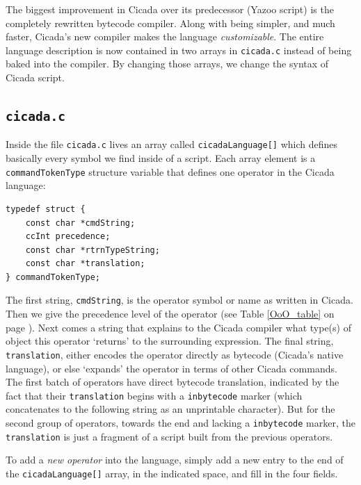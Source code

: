 \documentclass{article}
\newenvironment{code}{
       \begin{list}{}{
               \setlength{\leftmargin}{.4in}
               \setlength{\rightmargin}{0in}
               \setlength{\topsep}{.2in}
       }
       \small
       \item[] }
       { \end{list}   }
\begin{document}
The biggest improvement in Cicada over its predecessor (Yazoo script) is the completely rewritten bytecode compiler.  Along with being simpler, and much faster, Cicada's new compiler makes the language \emph{customizable}.  The entire language description is now contained in two arrays in \verb#cicada.c# instead of being baked into the compiler.  By changing those arrays, we change the syntax of Cicada script.



\subsection{\texttt{cicada.c}}

Inside the file \verb#cicada.c# lives an array called \verb#cicadaLanguage[]# which defines basically every symbol we find inside of a script.  Each array element is a \verb#commandTokenType# structure variable that defines one operator in the Cicada language:

\begin{code} \begin{verbatim}
typedef struct {
    const char *cmdString;
    ccInt precedence;
    const char *rtrnTypeString;
    const char *translation;
} commandTokenType;
\end{verbatim} \end{code}

\noindent The first string, \verb#cmdString#, is the operator symbol or name as written in Cicada.  Then we give the precedence level of the operator (see Table \ref{OoO_table} on page \pageref{OoO_table}).  Next comes a string that explains to the Cicada compiler what type(s) of object this operator `returns' to the surrounding expression.  The final string, \verb#translation#, either encodes the operator directly as bytecode (Cicada's native language), or else `expands' the operator in terms of other Cicada commands.  The first batch of operators have direct bytecode translation, indicated by the fact that their \verb#translation# begins with a \verb#inbytecode# marker (which concatenates to the following string as an unprintable character).  But for the second group of operators, towards the end and lacking a \verb#inbytecode# marker, the \verb#translation# is just a fragment of a script built from the previous operators.

To add a \emph{new operator} into the language, simply add a new entry to the end of the \verb#cicadaLanguage[]# array, in the indicated space, and fill in the four fields.
\end{document}

